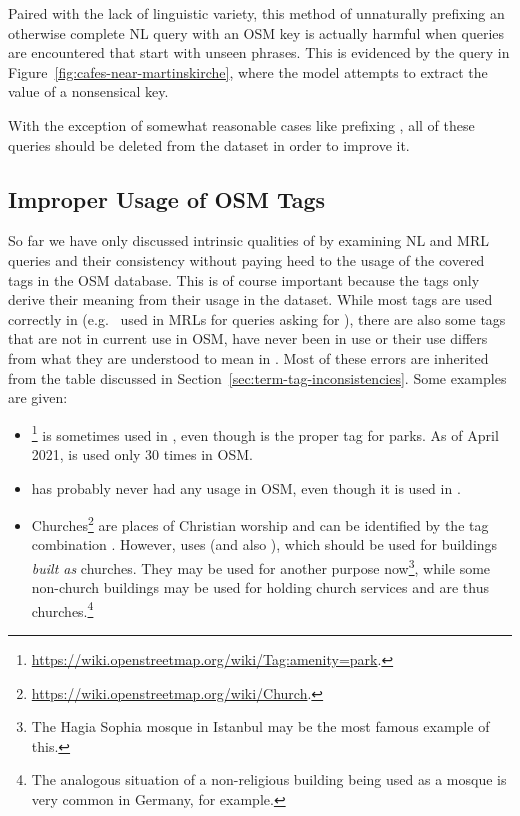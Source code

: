 Paired with the lack of linguistic variety, this method of unnaturally prefixing
an otherwise complete NL query with an OSM key is actually harmful when queries
are encountered that start with unseen phrases. This is evidenced by the query
 in
Figure~\ref{fig:cafes-near-martinskirche}, where the model attempts to extract
the value of a nonsensical  key.

With the exception of somewhat reasonable cases like prefixing , all of
these queries should be deleted from the dataset in order to improve it.

\subsection{Improper Usage of OSM Tags}
\label{sec:improper-osm-tags}

So far we have only discussed intrinsic qualities of \nlmapstwo{} by examining
NL and MRL queries and their consistency without paying heed to the usage of the
covered tags in the OSM database. This is of course important because the tags
only derive their meaning from their usage in the dataset. While most tags are
used correctly in \nlmapstwo{} (e.g.\  used in MRLs for
queries asking for ), there are also some tags that are not
in current use in OSM, have never been in use or their use differs from what
they are understood to mean in \nlmapstwo{}. Most of these errors are inherited
from the table discussed in Section~\ref{sec:term-tag-inconsistencies}. Some
examples are given:

\begin{itemize}
\item
  \footnote{\url{https://wiki.openstreetmap.org/wiki/Tag:amenity=park}.}
  is sometimes used in \nlmapstwo{}, even though  is the
  proper tag for parks. As of April 2021,  is used only
  \num{30} times in OSM.
\item {} has probably never had any usage in OSM, even though
  it is used in \nlmapstwo{}.
\item Churches\footnote{\url{https://wiki.openstreetmap.org/wiki/Church}.} are
  places of Christian worship and can be identified by the tag combination
  . However, \nlmapstwo{}
  uses  (and also ), which
  should be used for buildings \emph{built as} churches. They may be used for
  another purpose now\footnote{The Hagia Sophia mosque in Istanbul may be the
    most famous example of this.}, while some non-church buildings may be used
  for holding church services and are thus churches.\footnote{The analogous
    situation of a non-religious building being used as a mosque is very common
    in Germany, for example.}
\end{itemize}

